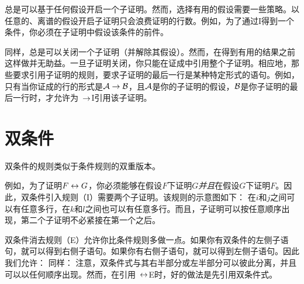 总是可以基于任何假设开启一个子证明。然而，选择有用的假设需要一些策略。以任意的、离谱的假设开启子证明只会浪费证明的行数。例如，为了通过{\eif}I得到一个条件，你必须在子证明中假设该条件的前件。

同样，总是可以关闭一个子证明（并解除其假设）。然而，在得到有用的结果之前这样做并无助益。一旦子证明关闭，你只能在证成中引用整个子证明。相应地，那些要求引用子证明的规则，要求子证明的最后一行是某种特定形式的语句。例如，只有当你证成的行的形式是$\mathcal{A} \rightarrow \mathcal{B}$，且$\mathcal{A}$是你的子证明的假设，$\mathcal{B}$是你子证明的最后一行时，才允许为~$\rightarrow$I引用该子证明。

\section{双条件}

双条件的规则类似于条件规则的双重版本。

例如，为了证明$F \leftrightarrow G$，你必须能够在假设$F$下证明$G$\emph{并且}在假设$G$下证明$F$。因此，双条件引入规则（{\eiff}I）需要两个子证明。该规则的示意图如下： 
在$i$和$j$之间可以有任意多行，在$k$和$l$之间也可以有任意多行。而且，子证明可以按任意顺序出现，第二个子证明不必紧接在第一个之后。

双条件消去规则（{\eiff}E）允许你比条件规则多做一点。如果你有双条件的左侧子语句，就可以得到右侧子语句。如果你有右侧子语句，就可以得到左侧子语句。因此我们允许：
同样：
注意，双条件式与其右半部分或左半部分可以彼此分离，并且可以以任何顺序出现。然而，在引用~$\leftrightarrow$E时，好的做法是先引用双条件式。

